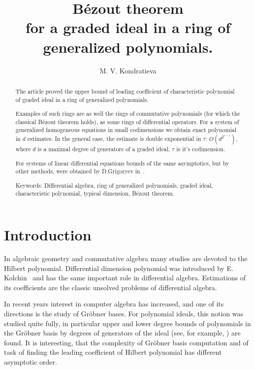 \documentclass[a4paper,reqno,12pt]{amsart}
\theoremstyle{plain}
\theoremstyle{remark}
\theoremstyle{definition}
\begin{document}
\title[]{B\'ezout theorem\\
for a graded ideal in a ring   of generalized polynomials.
} 
\author{M. V. Kondratieva} 
\address{Moscow State University\\ 
Department of Mechanics and Mathematics\\ Leninskie Gory, Moscow, 
Russia, 119991.}
 
\begin{abstract} 

The article proved the upper
bound of leading  coefficient of
characteristic polynomial of
graded ideal in a ring of generalized polynomials.

Examples of such rings are as well the rings of commutative polynomials
(for which the classical B\'ezout theorem holds),
 as some rings of differential operators.
For a system of  generalized homogeneous equations 
in small codimensions we   obtain
exact polynomial in $d$ estimates.
In the general case, the estimate is double exponential in
$\tau$:
$O(d^{2^{\tau-1}})$, 
where  $d$ is a maximal degree of generators 
of a graded ideal, 
 $\tau$ is it's codimension.

For systems of linear differential equations
bounds of the same asymptotics, but by other methods, were obtained
by D.Grigoryev 
in~\cite{Grig}.

 Keywords:
Differential algebra,
ring of generalized polynomials,
graded ideal,
characteristic polynomial, typical dimension,
B\'ezout theorem.
\end{abstract}

\maketitle
\thispagestyle{empty}

\section{Introduction}
In algebraic geometry and commutative algebra
many studies are devoted to the Hilbert polynomial.
Differential dimension polynomial was introduced  by
E. Kolchin~\cite {Kolchin}  and 
has the
same important role in differential algebra.  
Estimations of its coefficients
are the classic unsolved problems of differential algebra.

In recent years  interest in computer algebra has increased, 
and one of its directions is the study of Gr\"obner bases.
For polynomial ideals, this notion 
was studied    quite fully, in particular
upper and lower degree bounds of
polynomials in the Gr\"obner basis by
degrees of generators of the ideal 
(see, for example, \cite{Dube}) are found. It is interesting, that the 
complexity  of Gr\"obner basis computation
 and of task of finding the leading coefficient of  
Hilbert polynomial
has different asymptotic order.
\end{document}
